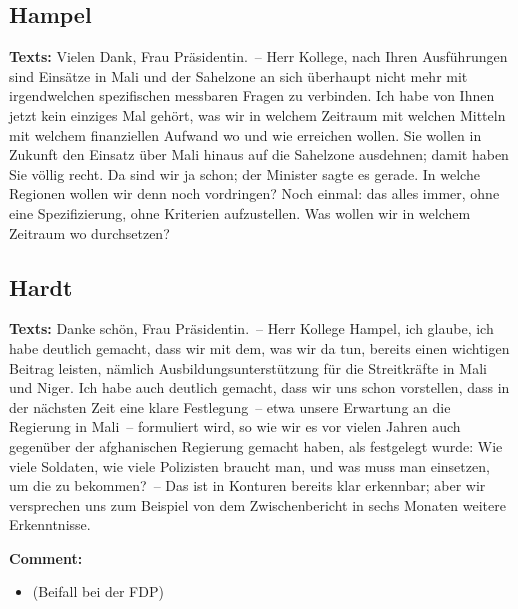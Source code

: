 \documentclass{article}
\begin{document}
\subsection{Hampel}
\noindent\textbf{Texts:} Vielen Dank, Frau Präsidentin. – Herr Kollege, nach Ihren Ausführungen sind Einsätze in Mali und der Sahelzone an sich überhaupt nicht mehr mit irgendwelchen spezifischen messbaren Fragen zu verbinden. Ich habe von Ihnen jetzt kein einziges Mal gehört, was wir in welchem Zeitraum mit welchen Mitteln mit welchem finanziellen Aufwand wo und wie erreichen wollen. Sie wollen in Zukunft den Einsatz über Mali hinaus auf die Sahelzone ausdehnen; damit haben Sie völlig recht. Da sind wir ja schon; der Minister sagte es gerade. In welche Regionen wollen wir denn noch vordringen? Noch einmal: das alles immer, ohne eine Spezifizierung, ohne Kriterien aufzustellen. Was wollen wir in welchem Zeitraum wo durchsetzen?

\subsection{Hardt}
\noindent\textbf{Texts:} Danke schön, Frau Präsidentin. – Herr Kollege Hampel, ich glaube, ich habe deutlich gemacht, dass wir mit dem, was wir da tun, bereits einen wichtigen Beitrag leisten, nämlich Ausbildungsunterstützung für die Streitkräfte in Mali und Niger. Ich habe auch deutlich gemacht, dass wir uns schon vorstellen, dass in der nächsten Zeit eine klare Festlegung – etwa unsere Erwartung an die Regierung in Mali – formuliert wird, so wie wir es vor vielen Jahren auch gegenüber der afghanischen Regierung gemacht haben, als festgelegt wurde: Wie viele Soldaten, wie viele Polizisten braucht man, und was muss man einsetzen, um die zu bekommen? – Das ist in Konturen bereits klar erkennbar; aber wir versprechen uns zum Beispiel von dem Zwischenbericht in sechs Monaten weitere Erkenntnisse. 

\noindent\textbf{Comment:}
\begin{itemize}
    \setlength\itemsep{-3pt}
    \item (Beifall bei der FDP)
\end{itemize}
\end{document}

